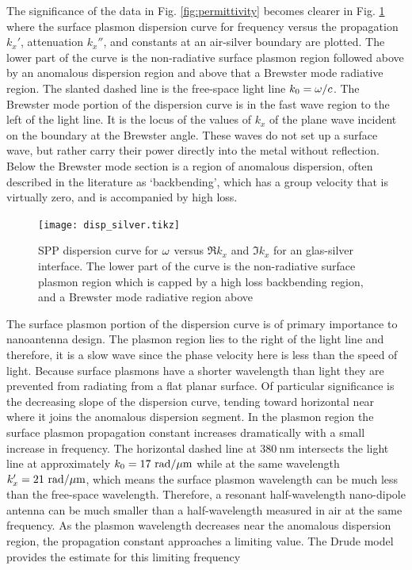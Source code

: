 \documentclass[11pt]{article}
\begin{document}
%
The significance of the data in Fig. \ref{fig:permittivity} becomes clearer in Fig. \ref{fig:dispersion} where the surface plasmon dispersion curve for frequency versus the propagation $k_x'$, attenuation $k_x''$, and constants at an air-silver boundary are plotted. The lower part of the curve is the non-radiative surface plasmon region followed above by an anomalous dispersion region and above that a Brewster mode radiative region. The slanted dashed line is the free-space light line $k_0 = \omega/c$.  The Brewster mode portion of the dispersion curve is in the fast wave region to the left of the light line. It is the locus of the values of $k_x$  of the plane wave incident on the boundary at the Brewster angle. These waves do not set up a surface wave, but rather carry their power directly into the metal without reflection.  Below the Brewster mode section is a region of anomalous dispersion, often described in the literature as  `backbending', which has a group velocity that is virtually zero, and is accompanied by high loss.
%
\begin{figure}[t!]
  \centering
  {\texttt{[image: disp\_silver.tikz]}}
  \caption{SPP dispersion curve for $\omega$ versus $\Re k_x$ and $\Im k_x$ for an glas-silver interface. The lower part of the curve is the non-radiative surface plasmon region which is capped by a high loss backbending region, and a Brewster mode radiative region above}
  \label{fig:dispersion}
\end{figure}
%
The surface plasmon portion of the dispersion curve is of primary importance to nanoantenna design. The plasmon region lies to the right of the light line and therefore, it is a slow wave since the phase velocity here is less than the speed of light. Because surface plasmons have a shorter wavelength than light they are prevented from radiating from a flat planar surface. Of particular significance is the decreasing slope of the dispersion curve, tending toward horizontal near where it joins the anomalous dispersion segment. In the plasmon region the surface plasmon propagation constant increases dramatically with a small increase in frequency. The horizontal dashed line at $380~\mathrm{nm}$ intersects the light line at approximately $k_0 = 17~\mathrm{rad/{\mu m}}$ while at the same wavelength $k_x' = 21~\mathrm{rad/{\mu m}}$, which means the surface plasmon wavelength can be much less than the free-space wavelength. Therefore, a resonant half-wavelength nano-dipole antenna can be much smaller than a half-wavelength measured in air at the same frequency. As the plasmon wavelength decreases near the anomalous dispersion region, the propagation constant approaches a limiting value. The Drude model provides the estimate for this limiting frequency
\end{document}
